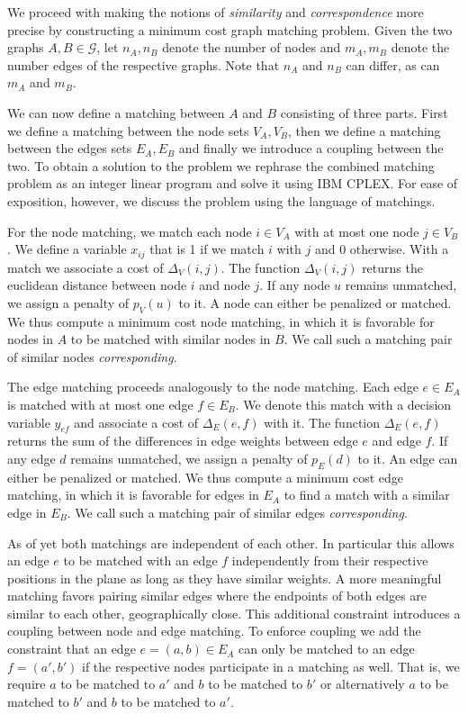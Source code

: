 		We proceed with making the notions of \emph{similarity} and \emph{correspondence} more precise by constructing a minimum cost graph matching problem. Given the two graphs $A,B \in \mathcal{G}$, let $n_A,n_B$ denote the number of nodes and $m_A,m_B$ denote the number edges of the respective graphs. Note that $n_A$ and $n_B$ can differ, as can $m_A$ and $m_B$.

		We can now define a matching between $A$ and $B$ consisting of three parts. First we define a matching between the node sets $V_A, V_B$, then we define a matching between the edges sets $E_A, E_B$ and finally we introduce a coupling between the two. To obtain a solution to the problem we rephrase the combined matching problem as an integer linear program and solve it using IBM CPLEX. For ease of exposition, however, we discuss the problem using the language of matchings.

		For the node matching, we match each node $i \in V_A$ with at most one node $j \in V_B$. We define a variable $x_{ij}$ that is 1 if we match $i$ with $j$ and 0 otherwise. With a match we associate a cost of $\Delta_V(i,j)$. The function $\Delta_V(i,j)$ returns the euclidean distance between node $i$ and node $j$. If any node $u$ remains unmatched, we assign a penalty of $p_V(u)$ to it. A node can either be penalized or matched. We thus compute a minimum cost node matching, in which it is favorable for nodes in $A$ to be matched with similar nodes in $B$. We call such a matching pair of similar nodes \emph{corresponding}.

		The edge matching proceeds analogously to the node matching. Each edge $e \in E_A$ is matched with at most one edge $f \in E_B$. We denote this match with a decision variable $y_{ef}$ and associate a cost of $\Delta_E(e,f)$ with it. The function $\Delta_E(e,f)$ returns the sum of the differences in edge weights between edge $e$ and edge $f$. If any edge $d$ remains unmatched, we assign a penalty of $p_E(d)$ to it. An edge can either be penalized or matched. We thus compute a minimum cost edge matching, in which it is favorable for edges in $E_A$ to find a match with a similar edge in $E_B$. We call such a matching pair of similar edges \emph{corresponding}.

		As of yet both matchings are independent of each other. In particular this allows an edge $e$ to be matched with an edge $f$ independently from their respective positions in the plane as long as they have similar weights. A more meaningful matching favors pairing similar edges where the endpoints of both edges are similar to each other, \ie geographically close. This additional constraint introduces a coupling between node and edge matching. To enforce coupling we add the constraint that an edge $e = (a,b) \in E_A$ can only be matched to an edge $f = (a',b')$ if the respective nodes participate in a matching as well. That is, we require $a$ to be matched to $a'$ and $b$ to be matched to $b'$ or alternatively $a$ to be matched to $b'$ and $b$ to be matched to $a'$. 

